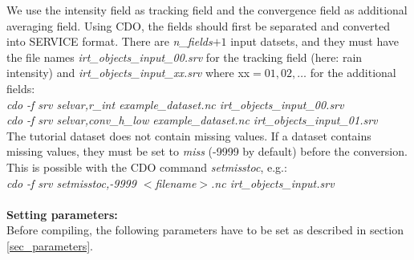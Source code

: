 \documentclass[11pt]{article}
\begin{document}
We use the intensity field as tracking field and the convergence field as additional averaging field. Using CDO, the fields should first be separated and converted into SERVICE format. There are {\it n\_fields}$+1$ input datsets, and they must have the file names {\it irt\_objects\_input\_00.srv} for the tracking field (here: rain intensity) and {\it irt\_objects\_input\_xx.srv} where xx$=01,02,\ldots$ for the additional fields:\\
{\it cdo -f srv selvar,r\_int example\_dataset.nc irt\_objects\_input\_00.srv}\\
{\it cdo -f srv selvar,conv\_h\_low example\_dataset.nc irt\_objects\_input\_01.srv}\\
The tutorial dataset does not contain missing values. If a dataset contains missing values, they must be set to {\it miss} (-9999 by default) before the conversion. This is possible with the CDO command {\it setmisstoc}, e.g.:\\
{\it cdo -f srv setmisstoc,-9999 $<$filename$>$.nc irt\_objects\_input.srv}\vspace{0.5cm}\\
\vspace{0.5cm}\\
{\bf Setting parameters:}\\
Before compiling, the following parameters have to be set as described in section \ref{sec_parameters}.\\
\end{document}
